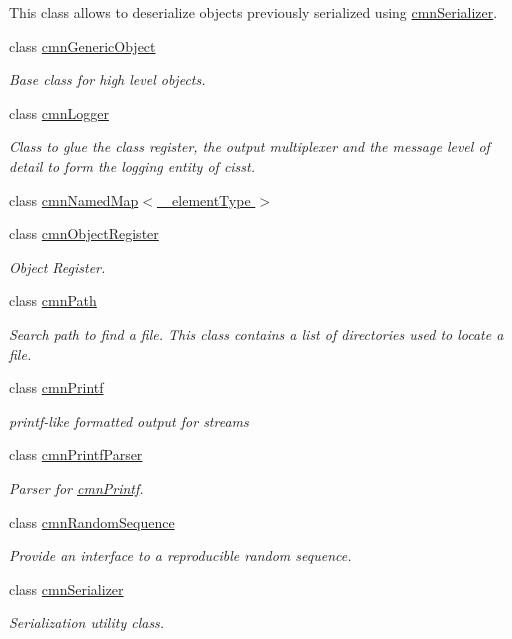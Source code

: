 \begin{DoxyCompactItemize}
\begin{DoxyCompactList}
This class allows to deserialize objects previously serialized using \hyperlink{classcmn_serializer}{cmn\-Serializer}. \end{DoxyCompactList}\item 
class \hyperlink{classcmn_generic_object}{cmn\-Generic\-Object}
\begin{DoxyCompactList}\small\item\em Base class for high level objects. \end{DoxyCompactList}\item 
class \hyperlink{classcmn_logger}{cmn\-Logger}
\begin{DoxyCompactList}\small\item\em Class to glue the class register, the output multiplexer and the message level of detail to form the logging entity of cisst. \end{DoxyCompactList}\item 
class \hyperlink{classcmn_named_map}{cmn\-Named\-Map$<$ \-\_\-element\-Type $>$}
\item 
class \hyperlink{classcmn_object_register}{cmn\-Object\-Register}
\begin{DoxyCompactList}\small\item\em Object Register. \end{DoxyCompactList}\item 
class \hyperlink{classcmn_path}{cmn\-Path}
\begin{DoxyCompactList}\small\item\em Search path to find a file. This class contains a list of directories used to locate a file. \end{DoxyCompactList}\item 
class \hyperlink{classcmn_printf}{cmn\-Printf}
\begin{DoxyCompactList}\small\item\em printf-\/like formatted output for streams \end{DoxyCompactList}\item 
class \hyperlink{classcmn_printf_parser}{cmn\-Printf\-Parser}
\begin{DoxyCompactList}\small\item\em Parser for \hyperlink{classcmn_printf}{cmn\-Printf}. \end{DoxyCompactList}\item 
class \hyperlink{classcmn_random_sequence}{cmn\-Random\-Sequence}
\begin{DoxyCompactList}\small\item\em Provide an interface to a reproducible random sequence. \end{DoxyCompactList}\item 
class \hyperlink{classcmn_serializer}{cmn\-Serializer}
\begin{DoxyCompactList}\small\item\em Serialization utility class.


\end{DoxyCompactList}
\end{DoxyCompactItemize}
